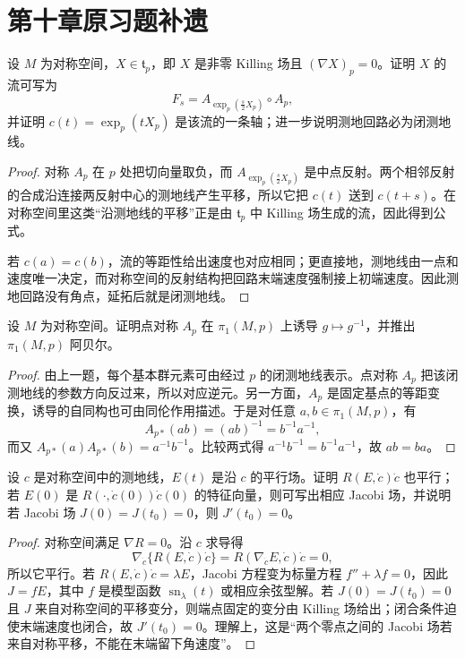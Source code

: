 \documentclass[11pt,a4paper,openany]{ctexbook}
\numberwithin{equation}{chapter}
\begin{document}
\section{第十章原习题补遗}

\begin{exercise}
设 \(M\) 为对称空间，\(X\in\mathfrak t_p\)，即 \(X\) 是非零 Killing 场且 \((\nabla X)_p=0\)。证明 \(X\) 的流可写为
\[
F_s=A_{\exp_p(\frac{s}{2}X_p)}\circ A_p,
\]
并证明 \(c(t)=\exp_p(tX_p)\) 是该流的一条轴；进一步说明测地回路必为闭测地线。
\end{exercise}
\begin{proof}
对称 \(A_p\) 在 \(p\) 处把切向量取负，而 \(A_{\exp_p(\frac{s}{2}X_p)}\) 是中点反射。两个相邻反射的合成沿连接两反射中心的测地线产生平移，所以它把 \(c(t)\) 送到 \(c(t+s)\)。在对称空间里这类“沿测地线的平移”正是由 \(\mathfrak t_p\) 中 Killing 场生成的流，因此得到公式。

若 \(c(a)=c(b)\)，流的等距性给出速度也对应相同；更直接地，测地线由一点和速度唯一决定，而对称空间的反射结构把回路末端速度强制接上初端速度。因此测地回路没有角点，延拓后就是闭测地线。
\end{proof}

\begin{exercise}
设 \(M\) 为对称空间。证明点对称 \(A_p\) 在 \(\pi_1(M,p)\) 上诱导 \(g\mapsto g^{-1}\)，并推出 \(\pi_1(M,p)\) 阿贝尔。
\end{exercise}
\begin{proof}
由上一题，每个基本群元素可由经过 \(p\) 的闭测地线表示。点对称 \(A_p\) 把该闭测地线的参数方向反过来，所以对应逆元。另一方面，\(A_p\) 是固定基点的等距变换，诱导的自同构也可由同伦作用描述。于是对任意 \(a,b\in\pi_1(M,p)\)，有
\[
A_{p*}(ab)=(ab)^{-1}=b^{-1}a^{-1},
\]
而又 \(A_{p*}(a)A_{p*}(b)=a^{-1}b^{-1}\)。比较两式得 \(a^{-1}b^{-1}=b^{-1}a^{-1}\)，故 \(ab=ba\)。
\end{proof}

\begin{exercise}
设 \(c\) 是对称空间中的测地线，\(E(t)\) 是沿 \(c\) 的平行场。证明 \(R(E,\dot c)\dot c\) 也平行；若 \(E(0)\) 是 \(R(\cdot,\dot c(0))\dot c(0)\) 的特征向量，则可写出相应 Jacobi 场，并说明若 Jacobi 场 \(J(0)=J(t_0)=0\)，则 \(J'(t_0)=0\)。
\end{exercise}
\begin{proof}
对称空间满足 \(\nabla R=0\)。沿 \(c\) 求导得
\[
\nabla_{\dot c}\{R(E,\dot c)\dot c\}=R(\nabla_{\dot c}E,\dot c)\dot c=0,
\]
所以它平行。若 \(R(E,\dot c)\dot c=\lambda E\)，Jacobi 方程变为标量方程 \(f''+\lambda f=0\)，因此 \(J=fE\)，其中 \(f\) 是模型函数 \(\operatorname{sn}_\lambda(t)\) 或相应余弦型解。若 \(J(0)=J(t_0)=0\) 且 \(J\) 来自对称空间的平移变分，则端点固定的变分由 Killing 场给出；闭合条件迫使末端速度也闭合，故 \(J'(t_0)=0\)。理解上，这是“两个零点之间的 Jacobi 场若来自对称平移，不能在末端留下角速度”。
\end{proof}
\end{document}
